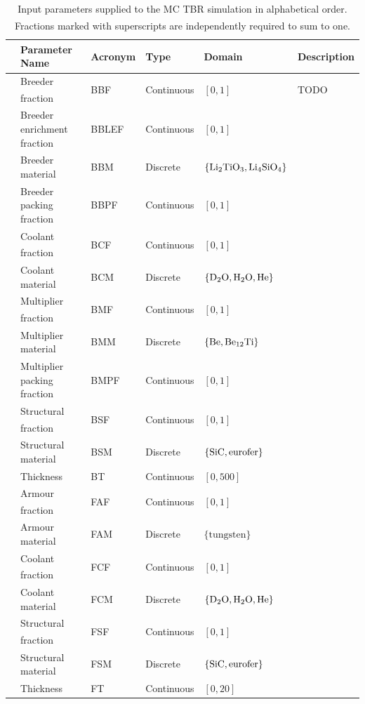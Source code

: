 \begin{table}[h]
	\centering
	{\footnotesize
		\begin{tabular}{l|lllll}
		\toprule
		{} & Parameter Name & Acronym & Type & Domain & Description\\
		\midrule
		\parbox[t]{2mm}{}
		   & Breeder fraction\textsuperscript{\textdagger} & BBF & Continuous & $[0,1]$ & TODO\\
		   & Breeder  enrichment fraction & BBLEF & Continuous & $[0,1]$ & {}\\
		   & Breeder material & BBM & Discrete & $\{\ce{Li2TiO3}, \ce{Li4SiO4}\}$ & {}\\
		   & Breeder packing fraction & BBPF & Continuous & $[0,1]$ & {}\\
		   & Coolant fraction\textsuperscript{\textdagger} & BCF & Continuous & $[0,1]$ & {}\\
		   & Coolant material & BCM & Discrete & $\{\ce{D2O}, \ce{H2O}, \ce{He}\}$ & {}\\
		   & Multiplier fraction\textsuperscript{\textdagger} & BMF & Continuous & $[0,1]$ & {}\\
		   & Multiplier material & BMM & Discrete & $\{\ce{Be}, \ce{Be12Ti}\}$ & {}\\
		   & Multiplier packing fraction & BMPF & Continuous & $[0,1]$ & {}\\
		   & Structural fraction\textsuperscript{\textdagger} & BSF & Continuous & $[0,1]$ & {}\\
		   & Structural material & BSM & Discrete & $\{\ce{SiC}, \text{eurofer}\}$ & {}\\
		   & Thickness & BT & Continuous & $[0,500]$ & {}\\
		\midrule
		\parbox[t]{2mm}{}
		   & Armour fraction\textsuperscript{\textdaggerdbl} & FAF & Continuous & $[0,1]$ & {}\\
		   & Armour material & FAM & Discrete & $\{\text{tungsten}\}$ & {}\\
		   & Coolant fraction\textsuperscript{\textdaggerdbl} & FCF & Continuous & $[0,1]$ & {}\\
		   & Coolant material & FCM & Discrete & $\{\ce{D2O}, \ce{H2O}, \ce{He}\}$ & {}\\
		   & Structural fraction\textsuperscript{\textdaggerdbl} & FSF & Continuous & $[0,1]$ & {}\\
		   & Structural material & FSM & Discrete & $\{\ce{SiC}, \text{eurofer}\}$ & {}\\
		   & Thickness & FT & Continuous & $[0,20]$ & {}\\
		\bottomrule
		\end{tabular}
	}
	\caption{Input parameters supplied to the MC TBR simulation in alphabetical
		order. Fractions marked with superscripts\textsuperscript{\textdagger
		\textdaggerdbl} are independently required to sum to one.}
	\label{tbl:params}
\end{table}

